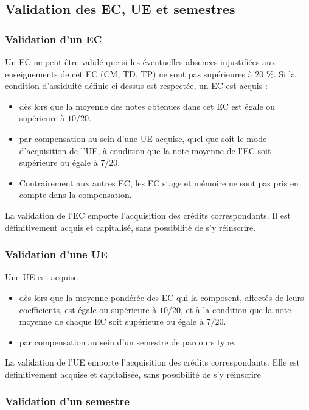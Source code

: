 \documentclass[a4paper,11pt]{article}
\begin{document}
\subsection{Validation des EC, UE et semestres}\label{Validation}
\subsubsection{Validation d'un EC}
Un EC ne peut être validé que si les éventuelles absences injustifiées aux enseignements de cet EC (CM, TD, TP) ne sont pas supérieures à 20 \%.
Si la condition d'assiduité définie ci-dessus est respectée, un EC est acquis :
\begin{itemize}
	\item dès lors que la moyenne des notes obtenues dans cet EC est égale ou supérieure à $10/20$.
	\item par compensation au sein d'une UE acquise, quel que soit le mode d'acquisition de l'UE, à condition que la note moyenne de l'EC soit supérieure ou égale à $7/20$.
	\item Contrairement aux autres EC, les EC stage et mémoire ne sont pas pris en compte dans la compensation.
\end{itemize}

La validation de l'EC emporte l'acquisition des crédits correspondants. Il est définitivement acquis et capitalisé, sans possibilité de s'y réinscrire.

\subsubsection{Validation d'une UE}
Une UE est acquise :
\begin{itemize}
	\item dès lors que la moyenne pondérée des EC qui la composent, affectés de leurs coefficients, est égale ou supérieure à $10/20$, et à la condition que la note moyenne de chaque EC soit supérieure ou égale à $7/20$.
	\item par compensation au sein d'un semestre de parcours type.
\end{itemize}

La validation de l'UE emporte l'acquisition des crédits correspondants. Elle est définitivement acquise et capitalisée, sans possibilité de s'y réinscrire


\subsubsection{Validation d'un semestre}
\end{document}
